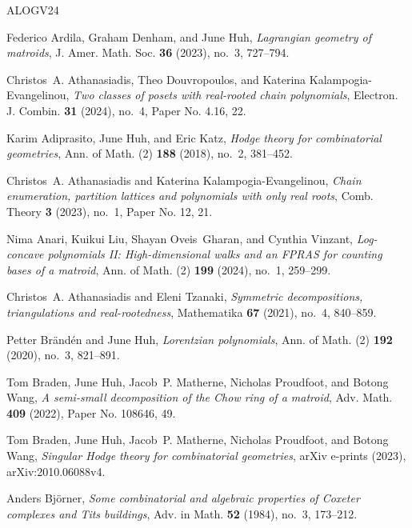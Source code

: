 \begin{thebibliography}{ALOGV24}

Federico Ardila, Graham Denham, and June Huh, \emph{Lagrangian geometry of matroids}, J. Amer. Math. Soc. \textbf{36} (2023), no.~3, 727--794. 

Christos~A. {Athanasiadis}, Theo {Douvropoulos}, and Katerina {Kalampogia-Evangelinou}, \emph{{Two classes of posets with real-rooted chain polynomials}}, Electron. J. Combin. \textbf{31} (2024), no.~4, Paper No. 4.16, 22. 

Karim Adiprasito, June Huh, and Eric Katz, \emph{Hodge theory for combinatorial geometries}, Ann. of Math. (2) \textbf{188} (2018), no.~2, 381--452. 

Christos~A. Athanasiadis and Katerina Kalampogia-Evangelinou, \emph{Chain enumeration, partition lattices and polynomials with only real roots}, Comb. Theory \textbf{3} (2023), no.~1, Paper No. 12, 21. 

Nima Anari, Kuikui Liu, Shayan Oveis~Gharan, and Cynthia Vinzant, \emph{Log-concave polynomials {II}: {H}igh-dimensional walks and an {FPRAS} for counting bases of a matroid}, Ann. of Math. (2) \textbf{199} (2024), no.~1, 259--299. 

Christos~A. Athanasiadis and Eleni Tzanaki, \emph{Symmetric decompositions, triangulations and real-rootedness}, Mathematika \textbf{67} (2021), no.~4, 840--859. 

Petter Br\"and\'en and June Huh, \emph{Lorentzian polynomials}, Ann. of Math. (2) \textbf{192} (2020), no.~3, 821--891. 

Tom Braden, June Huh, Jacob~P. Matherne, Nicholas Proudfoot, and Botong Wang, \emph{A semi-small decomposition of the {C}how ring of a matroid}, Adv. Math. \textbf{409} (2022), Paper No. 108646, 49. 

Tom {Braden}, June {Huh}, Jacob~P. {Matherne}, Nicholas {Proudfoot}, and Botong {Wang}, \emph{{Singular Hodge theory for combinatorial geometries}}, arXiv e-prints (2023), arXiv:2010.06088v4.

Anders Bj{\"o}rner, \emph{Some combinatorial and algebraic properties of {C}oxeter complexes and {T}its buildings}, Adv. in Math. \textbf{52} (1984), no.~3, 173--212. 


\end{thebibliography}
